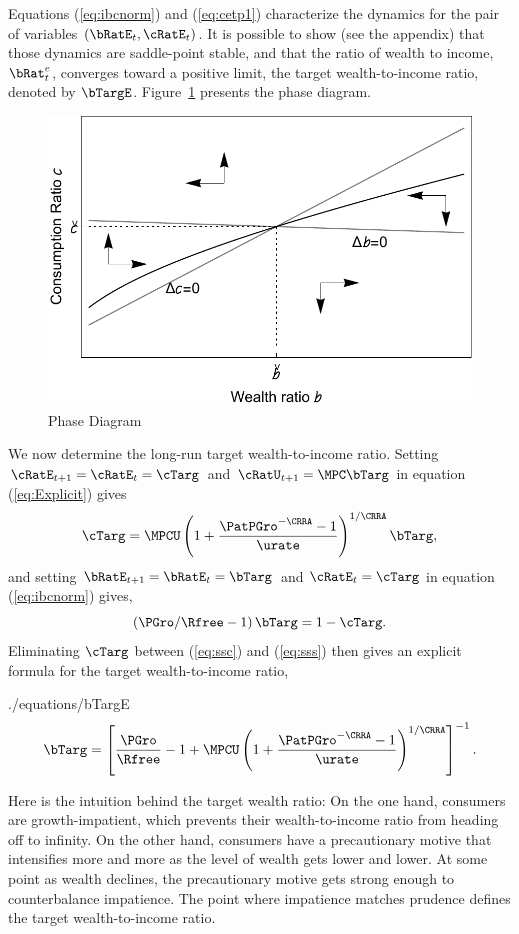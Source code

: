 \documentclass[titlepage]{\econtex}\newcommand{\texname}{cjSOE}
\begin{document}
Equations (\ref{eq:ibcnorm}) and (\ref{eq:cetp1}) characterize the dynamics for the pair of variables $(\bRatE_{t}, \cRatE_t)$. It is possible to show (see the appendix) that those dynamics are saddle-point stable, and that the ratio of wealth to income, $\bRat^e_t$, converges toward a positive limit, the target wealth-to-income ratio, denoted by $\bTargE$.
Figure~\ref{fig:phaseDiag} presents the phase diagram.

\begin{figure}
\includegraphics{./Figures/phaseDiag}
\caption{Phase Diagram}\label{fig:phaseDiag}
\end{figure}

We now determine the long-run target wealth-to-income ratio. Setting $\cRatE_{t+1}=\cRatE_t=\cTarg$ and $\cRatU_{t+1}=\MPC \bTarg$ in equation (\ref{eq:Explicit}) gives
\begin{equation}
\cTarg = \MPCU \left(1+\frac{\PatPGro^{-\CRRA}-1}{\urate}\right)^{1/\CRRA} \bTarg,
\label{eq:ssc}
\end{equation}
and setting $\bRatE_{t+1}=\bRatE_t=\bTarg$ and $\cRatE_t=\cTarg$ in equation (\ref{eq:ibcnorm}) gives,
\begin{equation}
\left(\PGro/\Rfree-1 \right) \bTarg = 1 -\cTarg. \label{eq:sss}
\end{equation}
Eliminating $\cTarg$ between (\ref{eq:ssc}) and (\ref{eq:sss}) then gives an explicit formula for the target wealth-to-income ratio,
\begin{verbatimwrite}{./equations/bTargE}
\begin{equation}
 \bTarg= \left[\frac{\PGro}{\Rfree}-1+\MPCU \left(1+\frac{\PatPGro^{-\CRRA}-1}{\urate}\right)^{1/\CRRA}\right]^{-1}.
\label{eq:bTargE}
\end{equation}
\end{verbatimwrite}

Here is the intuition behind the target wealth ratio:  On the one hand,
consumers are growth-impatient, which prevents their wealth-to-income ratio
from heading off to infinity.  On the other hand, consumers have
a precautionary motive that intensifies more and more as the level of
wealth gets lower and lower.  At some point as wealth declines, the precautionary motive
gets strong enough to counterbalance impatience.  The point where impatience matches prudence defines the target wealth-to-income ratio.
\end{document}

